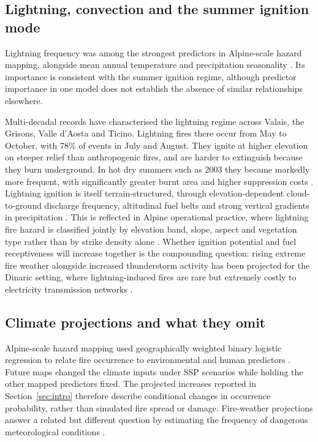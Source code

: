 \documentclass[11pt,a4paper]{article}
\begin{document}
\subsection{Lightning, convection and the summer ignition mode}

Lightning frequency was among the strongest predictors in Alpine-scale hazard mapping, alongside mean annual temperature and precipitation seasonality \citep{gerberding_mapping_2025}. Its importance is consistent with the summer ignition regime, although predictor importance in one model does not establish the absence of similar relationships elsewhere.

Multi-decadal records have characterised the lightning regime across Valais, the Grisons, Valle d'Aosta and Ticino. Lightning fires there occur from May to October, with 78\% of events in July and August. They ignite at higher elevation on steeper relief than anthropogenic fires, and are harder to extinguish because they burn underground. In hot dry summers such as 2003 they became markedly more frequent, with significantly greater burnt area and higher suppression costs \citep{conedera_lightninginduced_2006}. Lightning ignition is itself terrain-structured, through elevation-dependent cloud-to-ground discharge frequency, altitudinal fuel belts and strong vertical gradients in precipitation \citep{baranovskiy_deterministic_2021}. This is reflected in Alpine operational practice, where lightning fire hazard is classified jointly by elevation band, slope, aspect and vegetation type rather than by strike density alone \citep{muller_towards_2020}. Whether ignition potential and fuel receptiveness will increase together is the compounding question: rising extreme fire weather alongside increased thunderstorm activity has been projected for the Dinaric setting, where lightning-induced fires are rare but extremely costly to electricity transmission networks \citep{kyriakopoulos_impact_2023}.

\subsection{Climate projections and what they omit}

Alpine-scale hazard mapping used geographically weighted binary logistic regression to relate fire occurrence to environmental and human predictors \citep{gerberding_mapping_2025}. Future maps changed the climate inputs under SSP scenarios while holding the other mapped predictors fixed. The projected increases reported in Section~\ref{sec:intro} therefore describe conditional changes in occurrence probability, rather than simulated fire spread or damage. Fire-weather projections answer a related but different question by estimating the frequency of dangerous meteorological conditions \citep{miller_climate_2024}.
\end{document}
